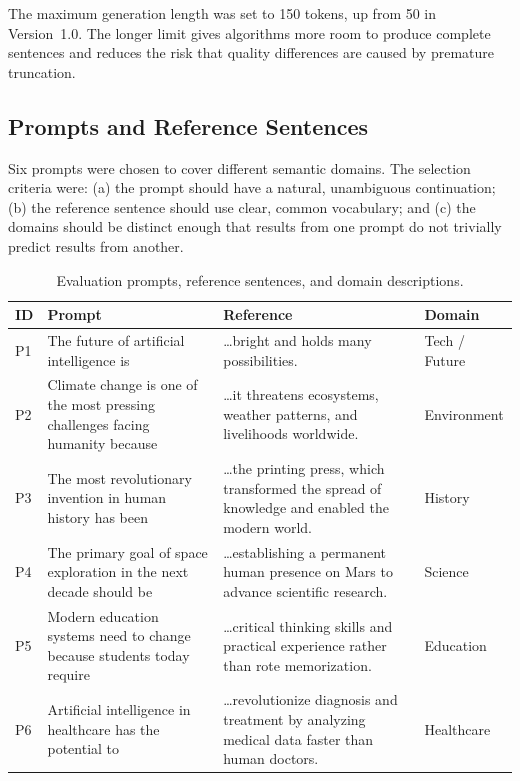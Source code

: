 \documentclass[12pt]{article}
\begin{document}
	The maximum generation length was set to 150 tokens, up from 50 in Version~1.0. The longer limit gives algorithms more room to produce complete sentences and reduces the risk that quality differences are caused by premature truncation.
	
	\subsection{Prompts and Reference Sentences}
	
	Six prompts were chosen to cover different semantic domains. The selection criteria were: (a) the prompt should have a natural, unambiguous continuation; (b) the reference sentence should use clear, common vocabulary; and (c) the domains should be distinct enough that results from one prompt do not trivially predict results from another.
	
\begin{table}[H]
	\centering
	\caption{Evaluation prompts, reference sentences, and domain descriptions.}
	\label{tab:prompts}
	\small
	\begin{tabularx}{\linewidth}{|l|X|X|l|}
		\hline
		\textbf{ID} & \textbf{Prompt} & \textbf{Reference} & \textbf{Domain} \\ \hline
		P1 & The future of artificial intelligence is & \dots bright and holds many possibilities. & Tech / Future \\ \hline
		P2 & Climate change is one of the most pressing challenges facing humanity because & \dots it threatens ecosystems, weather patterns, and livelihoods worldwide. & Environment \\ \hline
		P3 & The most revolutionary invention in human history has been & \dots the printing press, which transformed the spread of knowledge and enabled the modern world. & History \\ \hline
		P4 & The primary goal of space exploration in the next decade should be & \dots establishing a permanent human presence on Mars to advance scientific research. & Science \\ \hline
		P5 & Modern education systems need to change because students today require & \dots critical thinking skills and practical experience rather than rote memorization. & Education \\ \hline
		P6 & Artificial intelligence in healthcare has the potential to & \dots revolutionize diagnosis and treatment by analyzing medical data faster than human doctors. & Healthcare \\ \hline
	\end{tabularx}
\end{table}
	
\end{document}
